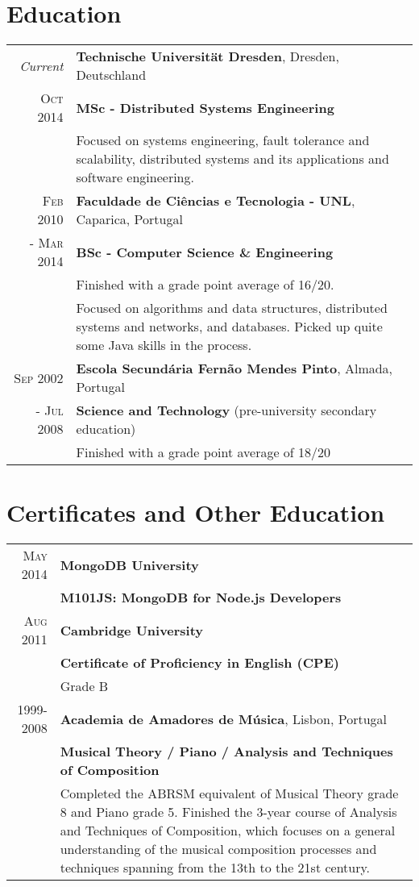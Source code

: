 \documentclass[a4paper,10pt]{article}
\begin{document}
\section{Education}
\begin{tabular}{rp{11cm}r}
\emph{Current} & \textbf{Technische Universität Dresden}, Dresden, Deutschland\\
\textsc{Oct} 2014 & \small \textbf{MSc - Distributed Systems Engineering}\\
& \footnotesize{Focused on systems engineering, fault tolerance and scalability, distributed systems and its applications and software engineering.}\\
\textsc{Feb} 2010 & \textbf{Faculdade de Ciências e Tecnologia - UNL}, Caparica, Portugal\\
- \textsc{Mar} 2014 & \small \textbf{BSc - Computer Science \& Engineering}\\
& \small Finished with a grade point average of 16/20.\\
& \footnotesize{Focused on algorithms and data structures, distributed systems and networks, and databases. Picked up quite some Java skills in the process.}\\
\textsc{Sep} 2002 & \textbf{Escola Secundária Fernão Mendes Pinto}, Almada, Portugal\\
- \textsc{Jul} 2008 & \small \textbf{Science and Technology} (pre-university secondary education)\\
& \small Finished with a grade point average of 18/20\\
\end{tabular}

\section{Certificates and Other Education}
\begin{tabular}{rp{11cm}}
 \textsc{May} 2014 & \textbf{MongoDB University}\\
 & \small \textbf{M101JS: MongoDB for Node.js Developers}\\
\textsc{Aug} 2011 & \textbf{Cambridge University}\\
& \small \textbf{Certificate of Proficiency in English (CPE)}\\
& \small Grade B\\
1999-2008 & \textbf{Academia de Amadores de Música}, Lisbon, Portugal\\
& \small \textbf{Musical Theory / Piano / Analysis and Techniques of Composition}\\
& \footnotesize{Completed the ABRSM equivalent of Musical Theory grade 8 and Piano grade 5. Finished the 3-year course of Analysis and Techniques of Composition, which focuses on a general understanding of the musical composition processes and techniques spanning from the 13th to the 21st century.}
\end{tabular}
\end{document}
